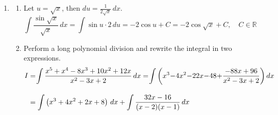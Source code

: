 \documentclass[a4paper, 12pt]{article}
\begin{document}
\begin{enumerate}[leftmargin=*,label=\textbf{\arabic*.}]
\begin{align*}V&=2\pi\hspace{-0.2em}\left[\frac{\sqrt{13}-1}2+\frac{\left(1-\sqrt{13}\right)^3}{12}+\frac{\left(1-\sqrt{13}\right)^4}{64}-\frac{1+\sqrt5}2+\frac{\left(1+\sqrt5\right)^3}{12}-\frac{\left(1+\sqrt5\right)^4}{64}\right]\\[1em]&\quad\:+2\pi\left[-\frac23+2-2-\left(\frac{\left(1-\sqrt{13}\right)^3}{12}+\frac{\left(1-\sqrt{13}\right)^2}2+1-\sqrt{13}\right)\right]\\[1em]&\quad\:+2\pi\left[\frac{-1+\sqrt5}2-\frac{\left(-1+\sqrt5\right)^3}{12}-\frac{\left(-1+\sqrt5\right)^4}{64}-\left(-1+\frac23-\frac14\right)\right]\end{align*}

After some mathematical operations, the volume is found to be
\[V=\frac{13\pi}6-\frac{\pi}4\left(47-13\sqrt{13}\right)=\boxed{\frac{\pi\left(39\sqrt{13}-115\right)}{12}}\]

The volume can also be evaluated by integrating over the domain and subtracting the region that is revolved twice. That is, the region beneath the region $2$ mapped on the graph.

\item \begin{enumerate}[leftmargin=*,label=\textbf{\alph*.}]
\item Let $u=\sqrt x$, then $\displaystyle du=\frac1{2\sqrt x}\,dx$.
\[\int\frac{\sin\sqrt x}{\sqrt x}\,dx=\int\sin u\cdot2\,du=-2\cos u+C=\boxed{-2\cos\sqrt x+C,\quad C\in\mathbb{R}}\]

\item Perform a long polynomial division and rewrite the integral in two expressions.
\begin{align}I&=\hspace{-0.2em}\int\frac{x^5+x^4-8x^3+10x^2+12x}{x^2-3x+2}\,dx=\hspace{-0.2em}\int\left(x^3\hspace{-0.2em}-\hspace{-0.2em}4x^2\hspace{-0.2em}-\hspace{-0.2em}22x\hspace{-0.2em}-\hspace{-0.2em}48\hspace{-0.2em}+\hspace{-0.2em}\frac{-88x+96}{x^2-3x+2}\right)dx\nonumber\\[1em]&=\int\left(x^3+4x^2+2x+8\right)\,dx+\int\frac{32x-16}{(x-2)(x-1)}\,dx\label{eq:15_16_fall_final_2}\end{align}


\end{enumerate}
\end{enumerate}
\end{document}
